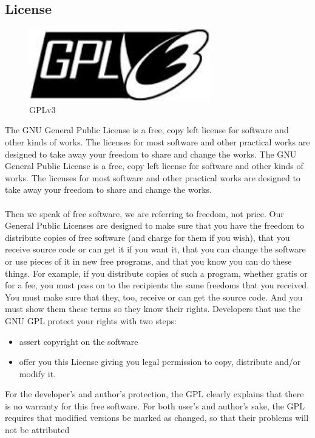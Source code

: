 \subsection{License}
\begin{figure}[h!]
\centering
\includegraphics[width=0.7\textwidth]{images/gpl.jpg}
\caption{GPLv3}
\end{figure}
The GNU General Public License is a free, copy left license for software and other kinds
of works. The licenses for most software and other practical works are designed to take
away your freedom to share and change the works. The GNU General Public License is a free, copy left license for software and other kinds
of works. The licenses for most software and other practical works are designed to take
away your freedom to share and change the works.\\\\
Then we speak of free software, we are referring to freedom, not price. Our General
Public Licenses are designed to make sure that you have the freedom to distribute copies
of free software (and charge for them if you wish), that you receive source code or can get
it if you want it, that you can change the software or use pieces of it in new free programs,
and that you know you can do these things. For example, if you distribute copies of such a program, whether gratis or for a fee,
you must pass on to the recipients the same freedoms that you received. You must make
sure that they, too, receive or can get the source code. And you must show them these
terms so they know their rights. Developers that use the GNU GPL protect your rights
with two steps:
\begin{itemize}
\item assert copyright on the software
\item oﬀer you this License giving you legal permission to copy, distribute and/or modify
it.
\end{itemize}
For the developer’s and author’s protection, the GPL clearly explains that there is no
warranty for this free software. For both user’s and author’s sake, the GPL requires that
modiﬁed versions be marked as changed, so that their problems will not be attributed

